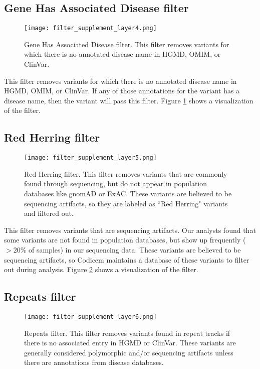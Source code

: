 \documentclass{article}
\begin{document}
\subsection{Gene Has Associated Disease filter}

\begin{figure}
\centering
\texttt{[image: filter\_supplement\_layer4.png]}
\caption{Gene Has Associated Disease filter.  This filter removes variants for which there is no annotated disease name in HGMD, OMIM, or ClinVar.}
\label{fig:filter4}
\end{figure}

This filter removes variants for which there is no annotated disease name in HGMD, OMIM, or ClinVar.  If any of those annotations for the variant has a disease name, then the variant will pass this filter.  Figure \ref{fig:filter4} shows a visualization of the filter.

\subsection{Red Herring filter}

\begin{figure}
\centering
\texttt{[image: filter\_supplement\_layer5.png]}
\caption{Red Herring filter.  This filter removes variants that are commonly found through sequencing, but do not appear in population databases like gnomAD or ExAC.  These variants are believed to be sequencing artifacts, so they are labeled as ``Red Herring" variants and filtered out.}
\label{fig:filter5}
\end{figure}

This filter removes variants that are sequencing artifacts.  Our analysts found that some variants are not found in population databases, but show up frequently ($>20$\% of samples) in our sequencing data.  These variants are believed to be sequencing artifacts, so Codicem maintains a database of these variants to filter out during analysis.  Figure \ref{fig:filter5} shows a visualization of the filter.

\subsection{Repeats filter}

\begin{figure}
\centering
\texttt{[image: filter\_supplement\_layer6.png]}
\caption{Repeats filter.  This filter removes variants found in repeat tracks if there is no associated entry in HGMD or ClinVar.  These variants are generally considered polymorphic and/or sequencing artifacts unless there are annotations from disease databases.}
\label{fig:filter6}
\end{figure}
\end{document}
